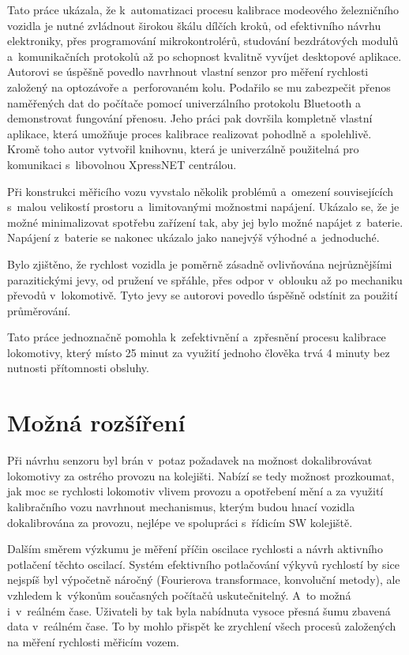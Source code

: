 Tato práce ukázala, že k~automatizaci procesu kalibrace modeového železničního
vozidla je nutné zvládnout širokou škálu dílčích kroků, od efektivního návrhu
elektroniky, přes programování mikrokontrolérů, studování bezdrátových modulů
a~komunikačních protokolů až po schopnost kvalitně vyvíjet desktopové aplikace.
Autorovi se úspěšně povedlo navrhnout vlastní senzor pro měření rychlosti
založený na optozávoře a~perforovaném kolu. Podařilo se mu zabezpečit přenos
naměřených dat do počítače pomocí univerzálního protokolu Bluetooth a
demonstrovat fungování přenosu. Jeho práci pak dovršila kompletně vlastní
aplikace, která umožňuje proces kalibrace realizovat pohodlně a~spolehlivě.
Kromě toho autor vytvořil knihovnu, která je univerzálně použitelná pro
komunikaci s~libovolnou XpressNET centrálou.

Při konstrukci měřicího vozu vyvstalo několik problémů a~omezení souvisejících
s~malou velikostí prostoru a~limitovanými možnostmi napájení. Ukázalo se, že je
možné minimalizovat spotřebu zařízení tak, aby jej bylo možné napájet
z~baterie.  Napájení z~baterie se nakonec ukázalo jako nanejvýš výhodné
a~jednoduché.

Bylo zjištěno, že rychlost vozidla je poměrně zásadně ovlivňována nejrůznějšími
parazitickými jevy, od pružení ve spřáhle, přes odpor v~oblouku až po mechaniku
převodů v~lokomotivě. Tyto jevy se autorovi povedlo úspěšně odstínit za použití
průměrování.

Tato práce jednoznačně pomohla k~zefektivnění a~zpřesnění procesu kalibrace
lokomotivy, který místo 25 minut za využití jednoho člověka trvá 4 minuty
bez nutnosti přítomnosti obsluhy.

\section{Možná rozšíření}

Při návrhu senzoru byl brán v~potaz požadavek na možnost dokalibrovávat
lokomotivy za ostrého provozu na kolejišti. Nabízí se tedy možnost prozkoumat,
jak moc se rychlosti lokomotiv vlivem provozu a opotřebení mění a za využití
kalibračního vozu navrhnout mechanismus, kterým budou hnací vozidla
dokalibrována za provozu, nejlépe ve spolupráci s~řídicím SW kolejiště.

Dalším směrem výzkumu je měření příčin oscilace rychlosti a návrh
aktivního potlačení těchto oscilací. Systém efektivního potlačování výkyvů
rychlostí by sice nejspíš byl výpočetně náročný (Fourierova transformace,
konvoluční metody), ale vzhledem k~výkonům současných počítačů uskutečnitelný.
A~to možná i~v~reálném čase. Uživateli by tak byla nabídnuta vysoce přesná šumu
zbavená data v~reálném čase. To by mohlo přispět ke zrychlení všech procesů
založených na měření rychlosti měřicím vozem.
